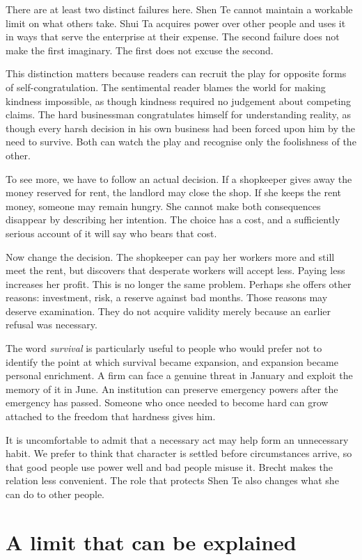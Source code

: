 \documentclass[12pt,a4paper]{book}
\begin{document}
There are at least two distinct failures here. Shen Te cannot maintain a workable limit on what others take. Shui Ta acquires power over other people and uses it in ways that serve the enterprise at their expense. The second failure does not make the first imaginary. The first does not excuse the second.

This distinction matters because readers can recruit the play for opposite forms of self-congratulation. The sentimental reader blames the world for making kindness impossible, as though kindness required no judgement about competing claims. The hard businessman congratulates himself for understanding reality, as though every harsh decision in his own business had been forced upon him by the need to survive. Both can watch the play and recognise only the foolishness of the other.

To see more, we have to follow an actual decision. If a shopkeeper gives away the money reserved for rent, the landlord may close the shop. If she keeps the rent money, someone may remain hungry. She cannot make both consequences disappear by describing her intention. The choice has a cost, and a sufficiently serious account of it will say who bears that cost.

Now change the decision. The shopkeeper can pay her workers more and still meet the rent, but discovers that desperate workers will accept less. Paying less increases her profit. This is no longer the same problem. Perhaps she offers other reasons: investment, risk, a reserve against bad months. Those reasons may deserve examination. They do not acquire validity merely because an earlier refusal was necessary.

The word \emph{survival} is particularly useful to people who would prefer not to identify the point at which survival became expansion, and expansion became personal enrichment. A firm can face a genuine threat in January and exploit the memory of it in June. An institution can preserve emergency powers after the emergency has passed. Someone who once needed to become hard can grow attached to the freedom that hardness gives him.

It is uncomfortable to admit that a necessary act may help form an unnecessary habit. We prefer to think that character is settled before circumstances arrive, so that good people use power well and bad people misuse it. Brecht makes the relation less convenient. The role that protects Shen Te also changes what she can do to other people.

\section*{A limit that can be explained}
\end{document}
